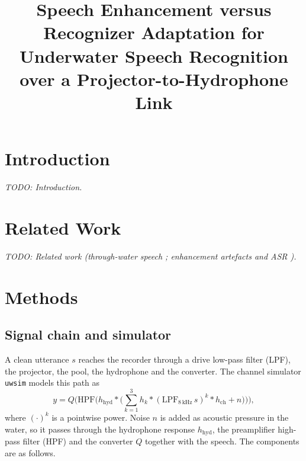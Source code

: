 \documentclass[conference]{IEEEtran}
\begin{document}
\title{Speech Enhancement versus Recognizer Adaptation for Underwater Speech Recognition over a Projector-to-Hydrophone Link}

\author{
}

\maketitle

\section{Introduction}
\textit{TODO: Introduction.}

\section*{Related Work}
\textit{TODO: Related work (through-water speech \cite{nissen2017,roehrdanz2025,roehrdanz2026}; enhancement artefacts and ASR \cite{iwamoto2022}).}

\section{Methods}
\label{sec:methods}

\subsection{Signal chain and simulator}
\label{sec:sim}
A clean utterance $s$ reaches the recorder through a drive low-pass filter (LPF), the projector, the
pool, the hydrophone and the converter. The channel simulator \texttt{uwsim} models this path as
\begin{equation}
y = Q\Big(\mathrm{HPF}\big(h_{\mathrm{hyd}} * \big(\textstyle\sum_{k=1}^{3} h_k * (\mathrm{LPF}_{8\,\mathrm{kHz}}\, s)^k * h_{\mathrm{ch}} + n\big)\big)\Big),
\label{eq:chain}
\end{equation}
where $(\cdot)^k$ is a pointwise power. Noise $n$ is added as acoustic pressure in the water, so it
passes through the hydrophone response $h_{\mathrm{hyd}}$, the preamplifier high-pass filter (HPF) and
the converter $Q$ together with the speech. The components are as follows.
\end{document}
